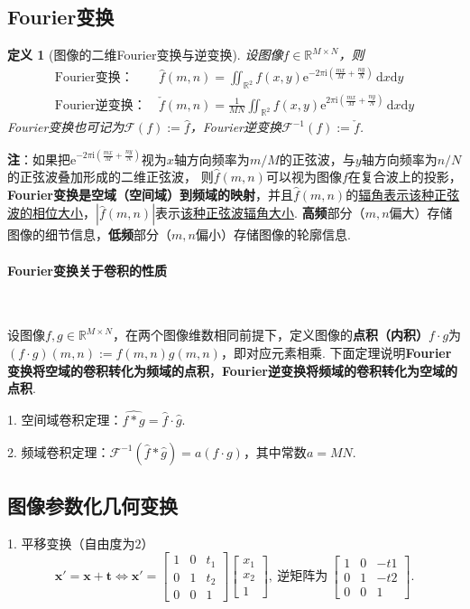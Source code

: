 \documentclass[12pt, a4paper, oneside]{ctexart}
\newtheorem{definition}{定义}
\numberwithin{equation}{section}  %
\theoremstyle{definition}
\def\bd{\boldsymbol}        %
\def\R{\mathbb{R}}          %
\def\d{\mathrm{d}}          %
\def\e{\mathrm{e}}          %
\def\i{\mathrm{i}}          %
\def\F{\mathcal{F}}         %
\def\wdh{\widehat}          %
\def\add{\vspace{1ex}}      %
\begin{document}
\subsection{Fourier变换}
\begin{definition}[图像的二维Fourier变换与逆变换] 
\add 设图像$f\in \R^{M\times N}$，则
\begin{align*}
    \text{Fourier变换：}&\ \hat{f}(m,n) = \iint_{\R^2}f(x,y)\e^{-2\pi\i\left(\frac{mx}{M}+\frac{ny}{N}\right)}\,\d x\d y\\
    \text{Fourier逆变换：}&\ \check{f}(m,n) = \frac{1}{MN}\iint_{\R^2}f(x,y)\e^{2\pi\i\left(\frac{mx}{M}+\frac{ny}{N}\right)}\,\d x\d y
\end{align*}
Fourier变换也可记为$\F(f) := \hat{f}$，Fourier逆变换$\F^{-1}(f) := \check{f}$.
\end{definition}
\textbf{注}：如果把$\e^{-2\pi\i\left(\frac{mx}{M}+\frac{ny}{N}\right)}$视为$x$轴方向频率为$m/M$的正弦波，与$y$轴方向频率为$n/N$的正弦波叠加形成的二维正弦波，
则$\hat{f}(m,n)$可以视为图像$f$在复合波上的投影，\textbf{Fourier变换是空域（空间域）到频域的映射}，并且$\hat{f}(m,n)$的\underline{辐角表示该种正弦波的相位大小}，$|\hat{f}(m,n)|$表示\underline{该种正弦波辐角大小}.
\textbf{高频}部分（$m,n$偏大）存储图像的细节信息，\textbf{低频}部分（$m,n$偏小）存储图像的轮廓信息.

\paragraph{Fourier变换关于卷积的性质}\ \par
设图像$f,g\in \R^{M\times N}$，在两个图像维数相同前提下，定义图像的\textbf{点积（内积）}$f\cdot g$为$(f\cdot g)(m,n) := f(m,n)g(m,n)$，即对应元素相乘.
下面定理说明\textbf{Fourier变换将空域的卷积转化为频域的点积}，\textbf{Fourier逆变换将频域的卷积转化为空域的点积}.
\add

1. 空间域卷积定理：$\wdh{f*g} = \hat{f}\cdot \hat{g}$.\add

2. 频域卷积定理：$\F^{-1}(\hat{f}*\hat{g}) = a(f\cdot g)$，其中常数$a = MN$.
\subsection{图像参数化几何变换}\label{sec-二维几何变换}

1. 平移变换（自由度为$2$）
\begin{equation*}
    \bd{x}' = \bd{x}+\bd{t}\iff \bd{x}' = \left[\begin{matrix}
        1&0&t_1\\ 0&1&t_2\\ 0&0&1
    \end{matrix}\right]\left[\begin{matrix}
        x_1\\x_2\\1
    \end{matrix}\right],\ \text{逆矩阵为}\ \left[\begin{matrix}
        1&0&-t1\\0&1&-t2\\0&0&1
    \end{matrix}\right].
\end{equation*}
\end{document}
